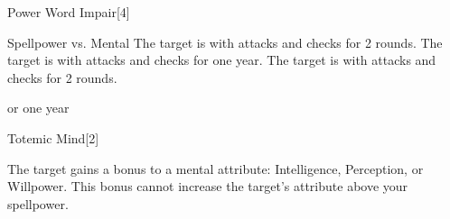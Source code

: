 \begin{spellfooter}
\begin{spellsection}{Power Word Impair}[4]
    \begin{spellheader}
    \end{spellheader}
    \begin{spellcontent}
        \begin{spelltargetinginfo}
        \end{spelltargetinginfo}
        \begin{spelleffects}
            \begin{spellattack}{Spellpower vs. Mental}
                \spellsuccess The target is \severelyimpaired with attacks and checks for 2 rounds.
                \spellcritical The target is \severelyimpaired with attacks and checks for one year.
                \spellfailure The target is \impaired with attacks and checks for 2 rounds.
            \end{spellattack}
            \spelldur \durbrief or one year
        \end{spelleffects}
    \end{spellcontent}
    \begin{spellfooter}
        \miscastrandom
    \end{spellfooter}
\end{spellsection}

\begin{spellsection}{Totemic Mind}[2]
    \begin{spellheader}
    \end{spellheader}
    \begin{spellcontent}
        \begin{spelltargetinginfo}
        \end{spelltargetinginfo}
        \begin{spelleffects}
            \spelleffect The target gains a  bonus to a mental attribute: Intelligence, Perception, or Willpower. This bonus cannot increase the target's attribute above your spellpower.
            \spelldur \durpersonallong
        \end{spelleffects}
    \end{spellcontent}
    \begin{spellfooter}
    \end{spellfooter}
    \begin{spellaugments}
    \end{spellaugments}
\end{spellsection}


\end{spellfooter}
